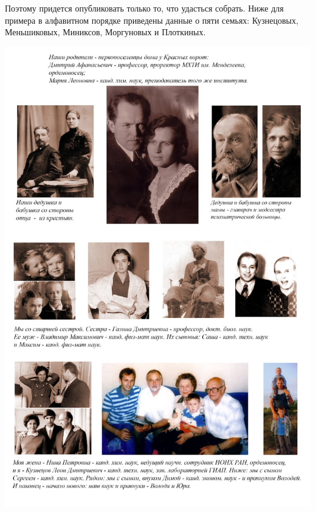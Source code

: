 Поэтому придется опубликовать только то, что удасться собрать. Ниже для примера в алфавитном порядке приведены данные о пяти семьях: Кузнецовых, Меньшиковых, Миниксов, Моргуновых и Плоткиных.

\noindent
\includegraphics[height=\paperheight]{inc/kuznecovy}





